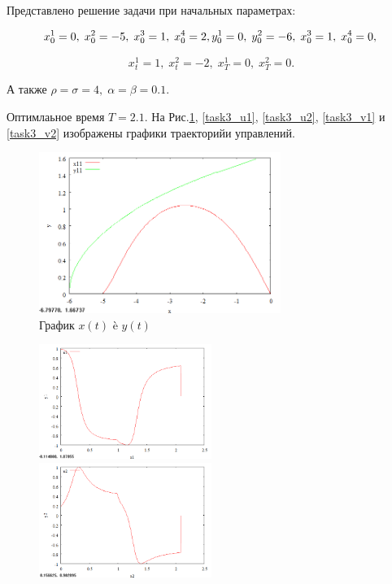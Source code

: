\documentclass[14pt]{article}
\begin{document}
Представлено решение задачи при начальных параметрах:

$$
    x^1_0 = 0,\; x^2_0 = -5,\; x^3_0 = 1,\; x^4_0 = 2, \\
    y^1_0 = 0,\; y^2_0 = -6,\; x^3_0 = 1,\; x^4_0 = 0, \\
$$

$$
    x^1_t = 1,\; x^2_t = -2,\; x^1_T = 0,\; x^2_T = 0.
$$

А также $\rho = \sigma = 4,\; \alpha = \beta = 0.1$.

Оптимлаьное время $ T = 2.1 $. На Рис.\ref{task3_xy}, \ref{task3_u1}, \ref{task3_u2}, \ref{task3_v1} и \ref{task3_v2} изображены графики траекторийи управлений.

\begin{figure}
\centering
\includegraphics[width=0.7\textwidth]{task3_xy}
\caption{График $x(t)$ è $y(t)$}
\label{task3_xy}
\end{figure}

\begin{figure}
\begin{floatrow}
    {\includegraphics[width=0.5\textwidth]{task3_u1}}
    {\includegraphics[width=0.5\textwidth]{task3_u2}}
\end{floatrow}
\end{figure}
\end{document}
